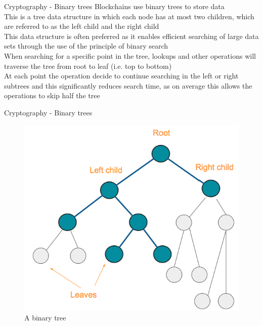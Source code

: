 \documentclass[11pt]{beamer}
\begin{document}
\begin{frame}{Cryptography - Binary trees}
	Blockchains use binary trees to store data \\ \vspace{3mm}
	This is a tree data structure in which each node has at most two children, which are referred to as the left child and the right child \\ \vspace{3mm}
	This data structure is often preferred as it enables efficient searching of large data sets through the use of the principle of binary search \\ \vspace{3mm}
	When searching for a specific point in the tree, lookups and other operations will traverse the tree from root to leaf (i.e. top to bottom)  \\ \vspace{3mm}
	At each point the operation decide to continue searching in the left or right subtrees and this significantly reduces search time, as on average this allows the operations to skip half the tree
\end{frame}


\begin{frame}{Cryptography - Binary trees}
	\begin{figure}[]
		\centering
		\includegraphics  [scale=0.3]{Images/binary}
		\caption{A binary tree}
	\end{figure}
\end{frame}
\end{document}
